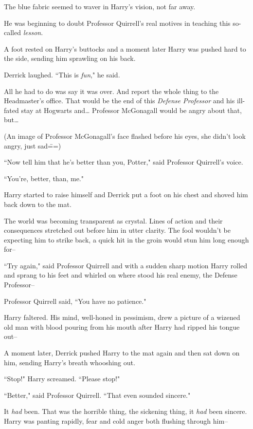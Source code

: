 The blue fabric seemed to waver in Harry's vision, not far away.

He was beginning to doubt Professor Quirrell's real motives in teaching this so-called \emph{lesson}.

A foot rested on Harry's buttocks and a moment later Harry was pushed hard to the side, sending him sprawling on his back.

Derrick laughed. ``This is \emph{fun}," he said.

All he had to do was say it was over. And report the whole thing to the Headmaster's office. That would be the end of this \emph{Defense Professor} and his ill-fated stay at Hogwarts and{\ldots} Professor McGonagall would be angry about that, but{\ldots}

(An image of Professor McGonagall's face flashed before his eyes, she didn't look angry, just sad\===)

``Now tell him that he's better than you, Potter," said Professor Quirrell's voice.

``You're, better, than, me."

Harry started to raise himself and Derrick put a foot on his chest and shoved him back down to the mat.

The world was becoming transparent as crystal. Lines of action and their consequences stretched out before him in utter clarity. The fool wouldn't be expecting him to strike back, a quick hit in the groin would stun him long enough for\---

``Try again," said Professor Quirrell and with a sudden sharp motion Harry rolled and sprang to his feet and whirled on where stood his real enemy, the Defense Professor\---

Professor Quirrell said, ``You have no patience."

Harry faltered. His mind, well-honed in pessimism, drew a picture of a wizened old man with blood pouring from his mouth after Harry had ripped his tongue out\---

A moment later, Derrick pushed Harry to the mat again and then sat down on him, sending Harry's breath whooshing out.

``Stop!" Harry screamed. ``Please stop!"

``Better," said Professor Quirrell. ``That even sounded sincere."

It \emph{had} been. That was the horrible thing, the sickening thing, it \emph{had} been sincere. Harry was panting rapidly, fear and cold anger both flushing through him\---

